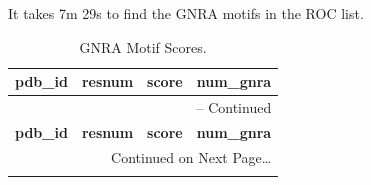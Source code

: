 It takes 7m 29s to find the GNRA motifs in the ROC list.

\begin{center}
\begin{longtable}{c|c|c|c}
\caption{GNRA Motif Scores.}
\label{tab:gnrascores}\\
\bf{pdb\_id} & \bf{resnum} & \bf{score} &
\bf{num\_gnra}   \\  \hline \hline
\endfirsthead

\multicolumn{4}{r}{{\tablename} \thetable{} -- Continued} \\
\bf{pdb\_id} & \bf{resnum} & \bf{score} &
\bf{num\_gnra} \\  \hline \hline

\endhead

\multicolumn{4}{r}{Continued on Next Page\ldots} \\
\endfoot
\endlastfoot


\end{longtable}
\end{center}
